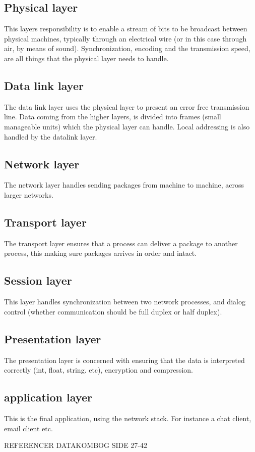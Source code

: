 \subsection{Physical layer}
This layers responsibility is to enable a stream of bits to be broadcast between physical machines, typically through an electrical wire (or in this case through air, by means of sound). Synchronization, encoding and the transmission speed, are all things that the physical layer needs to handle.

\subsection{Data link layer}
The data link layer uses the physical layer to present an error free transmission line. Data coming from the higher layers, is divided into frames (small manageable units) which the physical layer can handle. Local addressing is also handled by the datalink layer.

\subsection{Network layer}
The network layer handles sending packages from machine to machine, across larger networks.

\subsection{Transport layer}
The transport layer ensures that a process can deliver a package to another process, this making sure packages arrives in order and intact.

\subsection{Session layer}
This layer handles synchronization between two network processes, and dialog control (whether communication should be full duplex or half duplex).

\subsection{Presentation layer}
The presentation layer is concerned with ensuring that the data is interpreted correctly (int, float, string. etc), encryption and compression.

\subsection{application layer}
This is the final application, using the network stack. For instance a chat client, email client etc.

REFERENCER DATAKOMBOG SIDE 27-42